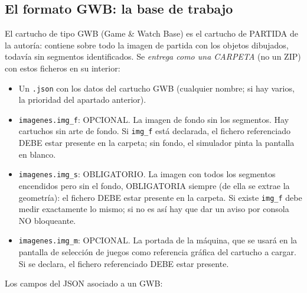 \subsection*{El formato GWB: la base de trabajo}
\label{sec:F1A01GWB}

El cartucho de tipo GWB (Game \& Watch Base) es el cartucho de PARTIDA de la autoría: contiene sobre todo la imagen de partida con los objetos dibujados, todavía sin
segmentos identificados. Se \emph{entrega como una CARPETA} (no un ZIP) con estos ficheros en su interior:

\begin{itemize}
	\item Un \texttt{.json} con los datos del cartucho GWB (cualquier nombre; si hay
	varios, la prioridad del apartado anterior).
	
	\item \texttt{imagenes.img\_f}: OPCIONAL. La imagen de fondo sin los segmentos. Hay 
	cartuchos sin arte de fondo. Si \texttt{img\_f} está declarada, el 	fichero referenciado
	DEBE estar presente en la carpeta; sin fondo, el simulador pinta la pantalla en blanco.
	
	\item \texttt{imagenes.img\_s}: OBLIGATORIO. La imagen con todos los segmentos encendidos pero sin 
	el fondo, OBLIGATORIA siempre (de ella se extrae la geometría): el fichero DEBE estar presente en la carpeta. Si existe \texttt{img\_f}
	debe medir exactamente lo mismo; si no es así hay que dar un aviso por consola NO bloqueante.
	
	\item \texttt{imagenes.img\_m}: OPCIONAL. La portada de la máquina, que se usará en la
	pantalla de selección de juegos como referencia gráfica del cartucho a cargar. Si se declara, el fichero referenciado DEBE estar presente.
\end{itemize}

Los campos del JSON asociado a un GWB:

